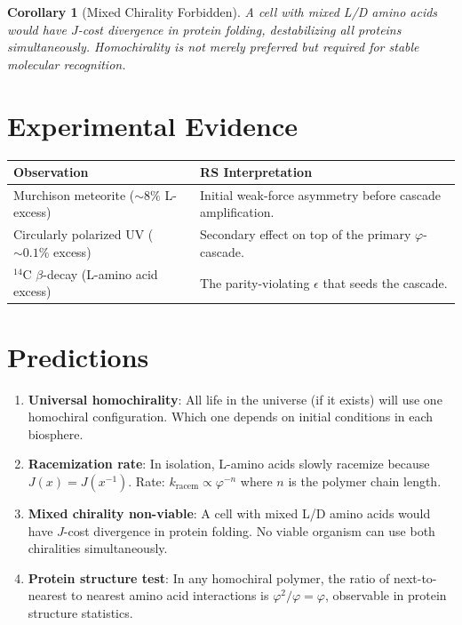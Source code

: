 \documentclass[12pt,a4paper]{article}
\newtheorem{corollary}[theorem]{Corollary}
\theoremstyle{definition}
\theoremstyle{remark}
\begin{document}
\begin{corollary}[Mixed Chirality Forbidden]
A cell with mixed L/D amino acids would have $J$-cost divergence in
protein folding, destabilizing all proteins simultaneously.
Homochirality is not merely preferred but \emph{required} for stable
molecular recognition.
\end{corollary}

\section{Experimental Evidence}
\label{sec:evidence}

\begin{center}
\renewcommand{\arraystretch}{1.3}
\begin{tabular}{@{}lp{9cm}@{}}
\toprule
\textbf{Observation} & \textbf{RS Interpretation} \\
\midrule
Murchison meteorite ($\sim\!8\%$ L-excess) &
Initial weak-force asymmetry before cascade amplification. \\
Circularly polarized UV ($\sim\!0.1\%$ excess) &
Secondary effect on top of the primary $\varphi$-cascade. \\
$^{14}$C $\beta$-decay (L-amino acid excess) &
The parity-violating $\epsilon$ that seeds the cascade. \\
\bottomrule
\end{tabular}
\end{center}

\section{Predictions}
\label{sec:predictions}

\begin{enumerate}
  \item \textbf{Universal homochirality}: All life in the universe
  (if it exists) will use one homochiral configuration.  Which one
  depends on initial conditions in each biosphere.

  \item \textbf{Racemization rate}: In isolation, L-amino acids
  slowly racemize because $J(x) = J(x^{-1})$.  Rate:
  $k_{\mathrm{racem}} \propto \varphi^{-n}$ where $n$ is the polymer
  chain length.

  \item \textbf{Mixed chirality non-viable}: A cell with mixed L/D
  amino acids would have $J$-cost divergence in protein folding.
  No viable organism can use both chiralities simultaneously.

  \item \textbf{Protein structure test}: In any homochiral polymer,
  the ratio of next-to-nearest to nearest amino acid interactions is
  $\varphi^2/\varphi = \varphi$, observable in protein structure
  statistics.
\end{enumerate}
\end{document}
